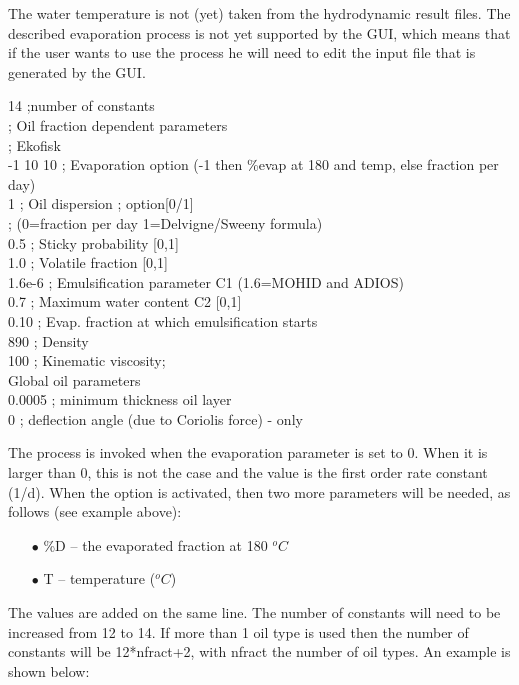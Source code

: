 \documentclass[english]{deltares_manual}
\begin{document}
The water temperature is not (yet) taken from the hydrodynamic result files. 
The described evaporation process is not yet supported by the GUI, which means that if the user wants to use the process he will need to edit the input file that is generated by the GUI.\\ 
\begin{tcolorbox}
   14 ;number of constants \\
; Oil fraction dependent parameters\\
; Ekofisk \\
-1     10 10        ; Evaporation option (-1 then \%evap at 180 and temp, else fraction per day)\\
1               ; Oil dispersion ; option[0/1] \\
; (0=fraction per day 1=Delvigne/Sweeny formula)\\
0.5               ; Sticky probability [0,1]\\
1.0               ; Volatile fraction [0,1]\\
1.6e-6               ; Emulsification parameter C1 (1.6=MOHID and ADIOS)\\
0.7               ; Maximum water content C2  [0,1]\\
0.10               ; Evap. fraction at which emulsification starts\\
890               ; Density \\
100               ; Kinematic viscosity; \\
Global oil parameters\\
0.0005               ; minimum thickness oil layer\\
0               ; deflection angle (due to Coriolis force) - only
\end{tcolorbox}

The process is invoked when the evaporation parameter is set to 0. When it is larger than 0, this is not the case and the value is the first order rate constant (1/d). When the option is activated, then two more parameters will be needed, as follows (see example above):
\begin{itemize}
	\item[$\bullet$] \%D – the evaporated fraction at 180 $^{o}C$
	\item[$\bullet$] T – temperature ($^{o}C$)
\end{itemize}
The values are added on the same line.
The number of constants will need to be increased from 12 to 14. If more than 1 oil type is used then the number of constants will be 12*nfract+2, with nfract the number of oil types. An example is shown  below:\\
\end{document}
